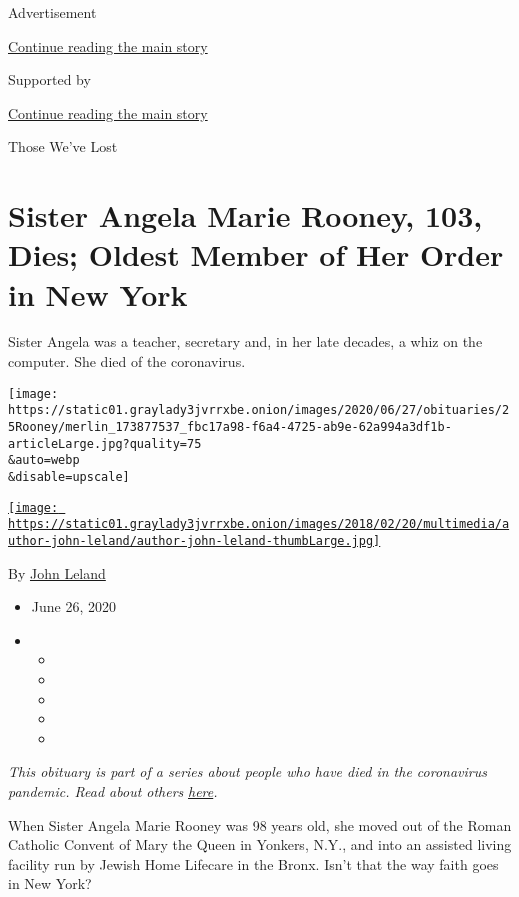 Advertisement

\protect\hyperlink{after-top}{Continue reading the main story}

Supported by

\protect\hyperlink{after-sponsor}{Continue reading the main story}

Those We've Lost

\hypertarget{sister-angela-marie-rooney-103-dies-oldest-member-of-her-order-in-new-york}{%
\section{Sister Angela Marie Rooney, 103, Dies; Oldest Member of Her
Order in New
York}\label{sister-angela-marie-rooney-103-dies-oldest-member-of-her-order-in-new-york}}

Sister Angela was a teacher, secretary and, in her late decades, a whiz
on the computer. She died of the coronavirus.

\texttt{[image: https://static01.graylady3jvrrxbe.onion/images/2020/06/27/obituaries/25Rooney/merlin\_173877537\_fbc17a98-f6a4-4725-ab9e-62a994a3df1b-articleLarge.jpg?quality=75\\\&auto=webp\\\&disable=upscale]}

\href{https://www.nytimes3xbfgragh.onion/by/john-leland}{\texttt{[image: https://static01.graylady3jvrrxbe.onion/images/2018/02/20/multimedia/author-john-leland/author-john-leland-thumbLarge.jpg]}}

By \href{https://www.nytimes3xbfgragh.onion/by/john-leland}{John Leland}

\begin{itemize}
\item
  June 26, 2020
\item
  \begin{itemize}
  \item
  \item
  \item
  \item
  \item
  \end{itemize}
\end{itemize}

\emph{This obituary is part of a series about people who have died in
the coronavirus pandemic. Read about others}
\href{https://www.nytimes3xbfgragh.onion/interactive/2020/obituaries/people-died-coronavirus-obituaries.html}{\emph{here}}\emph{.}

When Sister Angela Marie Rooney was 98 years old, she moved out of the
Roman Catholic Convent of Mary the Queen in Yonkers, N.Y., and into an
assisted living facility run by Jewish Home Lifecare in the Bronx. Isn't
that the way faith goes in New York?

